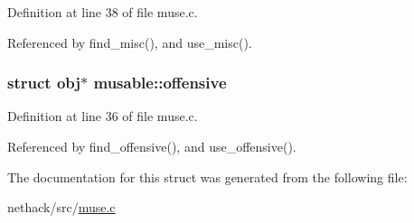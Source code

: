 Definition at line 38 of file muse.\+c.



Referenced by find\+\_\+misc(), and use\+\_\+misc().

\hypertarget{structmusable_a016d6af9ae60f010812a200105259397}{
\subsubsection[{offensive}]{\setlength{\rightskip}{0pt plus 5cm}struct {\bf obj}$\ast$ musable\+::offensive}}\label{structmusable_a016d6af9ae60f010812a200105259397}


Definition at line 36 of file muse.\+c.



Referenced by find\+\_\+offensive(), and use\+\_\+offensive().



The documentation for this struct was generated from the following file\+:\begin{DoxyCompactItemize}
\item 
nethack/src/\hyperlink{muse_8c}{muse.\+c}\end{DoxyCompactItemize}
